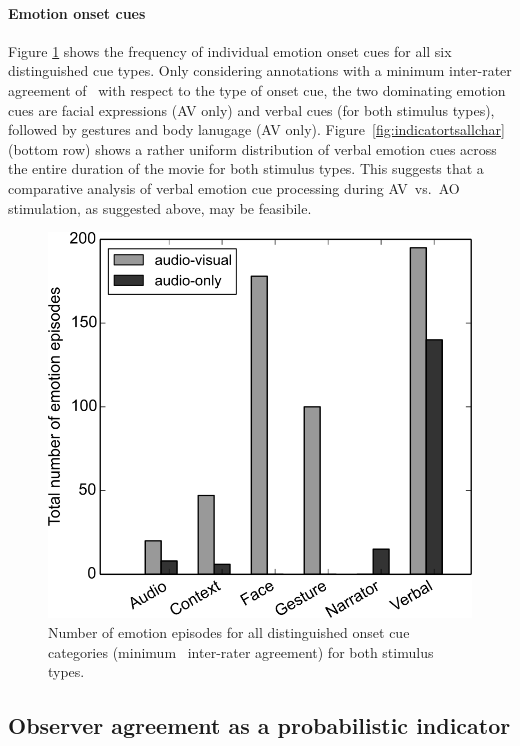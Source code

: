 \documentclass[10pt,a4paper,twocolumn]{article}
\begin{document}
\paragraph{Emotion onset cues} Figure \ref{fig:threshlabeledoncue} shows the
frequency of individual emotion onset cues for all six distinguished cue types.
Only considering annotations with a minimum inter-rater agreement of
\AVAggThresh\ with respect to the type of onset cue, the two dominating emotion
cues are facial expressions (AV only) and verbal cues (for both stimulus
types), followed by gestures and body lanugage (AV only).
Figure~\ref{fig:indicatortsallchar} (bottom row) shows a rather uniform
distribution of verbal emotion cues across the entire duration of the movie for
both stimulus types. This suggests that a comparative analysis of verbal
emotion cue processing during AV~vs.~AO stimulation, as suggested above, may be
feasibile.

\begin{figure}
  \centering
  \includegraphics[trim=00 40 35 26,clip,width=\linewidth]{figures/labeledoncue_episodes}
  \caption{Number of emotion episodes for all distinguished onset cue categories
    (minimum \AVAggThresh\ inter-rater agreement) for both stimulus types.}
  \label{fig:threshlabeledoncue}
\end{figure}

\subsection*{Observer agreement as a probabilistic indicator}
\end{document}
